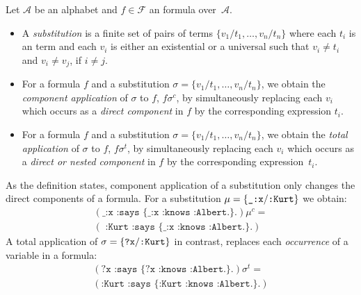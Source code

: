 \begin{definition}[Substitution]
%
Let $\mathcal{A}$ be an \nthree alphabet 
and $f\in \mathcal{F}$ an \nthree formula over~$\mathcal{A}$. 
\begin{itemize}
 \item A \emph{substitution} is a finite set of pairs of terms $\{v_1/t_1, \ldots, v_n/t_n\}$ where each $t_i$ is an term and each $v_i$ is either an existential 
 or a universal such that $v_i\neq t_i$ and 
 $v_i \neq v_j$,
 if $i\neq j$.  
 \item 
 For a formula $f$ and a substitution $\sigma=\{v_1/t_1, \ldots, v_n/t_n\}$, we obtain the \emph{component application} 
 of $\sigma$ to $f$, $f\sigma^c$, by simultaneously replacing each $v_i$ 
 which occurs as a \emph{direct component} in $f$ by the corresponding expression $t_i$. 
 \item 
 For a formula $f$ and a substitution $\sigma=\{v_1/t_1, \ldots, v_n/t_n\}$, we obtain the \emph{total application} of $\sigma$ to $f$, $f\sigma^t$, 
 by simultaneously replacing each $v_i$ 
 which occurs as a \emph{direct or nested component} in $f$ by the corresponding expression~$t_i$. 
 \end{itemize}
\end{definition}

As the definition states, component application of a substitution only changes the direct components of a formula. 
For a substitution $\mu=\{\verb!_:x!/ \verb!:Kurt!\}$ we obtain:
\begin{multline}
(\texttt{\_:x :says \{\_:x :knows :Albert.\}.})\mu^c  =\nonumber \\ (\texttt{ :Kurt :says \{\_:x :knows :Albert.\}.})\nonumber
\end{multline}
A total application of $\sigma=\{\verb!?x!/ \verb!:Kurt!\}$ in contrast, replaces each \emph{occurrence} of a variable in a formula: 
\begin{multline}
(\texttt{?x :says \{?x :knows :Albert.\}.})\sigma^t =\\ (\texttt{:Kurt :says \{:Kurt :knows :Albert.\}.})\nonumber
\end{multline}







% 
% 
% 

